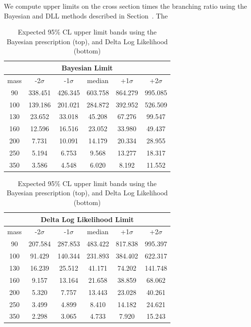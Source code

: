 We compute upper limits on the cross section times the branching ratio using the 
Bayesian and DLL methods described in Section~\label{sec:statmethod}.  The 
\begin{table}
  \begin{center}
    \begin{tabular}{|c|c|c|c|c|c|}
    \hline
    \multicolumn{6}{|c|}{Bayesian Limit} \\
    \hline
   mass &-2$\sigma$&-1$\sigma$&   median &+1$\sigma$&+2$\sigma$\\  \hline
     90 &  338.451 &  426.345  &  603.758 &  864.279 &  995.085 \\
    100 &  139.186 &  201.021  &  284.872 &  392.952 &  526.509 \\
    130 &   23.652 &   33.018  &   45.208 &   67.276 &   99.547 \\
    160 &   12.596 &   16.516  &   23.052 &   33.980 &   49.437 \\
    200 &    7.731 &   10.091  &   14.179 &   20.334 &   28.955 \\
    250 &    5.194 &    6.753  &    9.568 &   13.277 &   18.317 \\
    350 &    3.586 &    4.548  &    6.020 &    8.192 &   11.552 \\  \hline
    \end{tabular}
    \begin{tabular}{|c|c|c|c|c|c|}
    \hline
    \multicolumn{6}{|c|}{Delta Log Likelihood Limit} \\
    \hline
   mass &-2$\sigma$&-1$\sigma$&   median &+1$\sigma$&+2$\sigma$\\  \hline
     90 &  207.584 &  287.853  &  483.422 &  817.838 &  995.397 \\
    100 &   91.429 &  140.344  &  231.893 &  384.402 &  622.317 \\
    130 &   16.239 &   25.512  &   41.171 &   74.202 &  141.748 \\
    160 &    9.157 &   13.164  &   21.658 &   38.859 &   68.062 \\
    200 &    5.320 &    7.757  &   13.443 &   23.028 &   40.261 \\
    250 &    3.499 &    4.899  &    8.410 &   14.182 &   24.621 \\
    350 &    2.298 &    3.065  &    4.733 &    7.920 &   15.243 \\  \hline
    \end{tabular}
    \caption[Expected 95\% CL $\sigma \times \text{BR}$ upper limits] {Expected
    95\% CL upper limit bands using the Bayesian prescription (top), and Delta
    Log Likelihood (bottom)}
    \label{tab-exp-limit-TaNC}
  \end{center}
\end{table}

